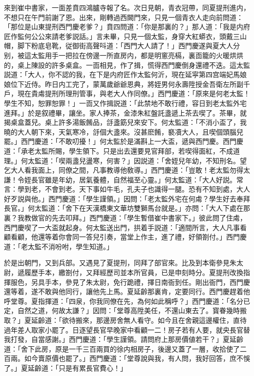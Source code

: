 來到崔中書家，一面差賁四鴻臚寺報了名。次日見朝，青衣冠帶，同夏提刑進内，不想只在午門前謝了恩。出來，剛轉過西闕門來，只見一個青衣人走向前問道：「那位是山東提刑西門慶老爹？」賁四問道：「你是那裏的？」那人道：「我是内府匠作監何公公來請老爹説話。」言未畢，只見一個太監，身穿大紅蟒衣，頭戴三山帽，脚下粉底皂靴，従御街高聲呌道：「西門大人請了！」西門慶遂與夏大人分别，被這太監用手一把拉在傍邊一所直房内，都是明窻亮槅，裏靣籠的火暖烘烘的，桌上陳設的許多桌盒。一靣相見，作了揖，慌得西門慶倒身還禮不迭。這太監説道：「大人，你不認的我，在下是内府匠作太監何沂，現在延寜第四宫端妃馬娘娘位下近侍。昨日内工完了，蒙萬歲爺爺恩典，將姪男何永壽陞授金吾衛左所副千戶，現在貴䖏提刑所理刑管事，與老大人作同僚。」西門慶道：「原來是何老太監！學生不知，恕罪恕罪！」一靣又作揖説道：「此禁地不敢行禮，容日到老太監外宅進拜。」於是叙禮畢，讓坐。家人捧茶，金漆朱紅盤託盞遞上茶去喫了。茶畢，就揭桌盒蓋兒。桌上許多湯飯餚品，㧱盞筯兒來安下。何太監道：「不消小盃了，我曉的大人朝下來，天氣寒冷，㧱個大盞來。沒甚麽餚，褻凟大人，且喫個頭腦兒罷。」西門慶道：「不敢叨擾！」何太監於是滿斟上一大盃，遞與西門慶。西門慶道：「承老太監所賜，學生領下。只是出去還要見官拜部，若喫得面紅，不成道理。」何太監道：「喫兩盞兒盪寒，何害？」因説道：「舍姪兒年幼，不知刑名。望乞大人看我面上，同僚之間，凡事教導他敎導。」西門慶道：「豈敢！老太監勿得太謙！令姪長官雖是年幼，居氣養體，自然福至心靈。」何太監道：「大人好説。常言：學到老，不會到老。天下事如牛毛，孔夫子也識得一腿。恐有不知到處，大人好歹説與他。」西門慶道：「學生謹領。」因問：「老太監外宅在何䖏？學生好去奉拜長官。」何太監道：「舍下在天漢橋東文華坊雙獅馬台就是。」亦問：「大人下處在那裏？我教做官的先去叩拜。」西門慶道：「學生暫借崔中書家下。」彼此問了住䖏，西門慶喫了一大盃就起身。何太監送出門，拱着手説道：「適間所言，大人凡事看顧看顧，他還等着你會同一答兒引奏，當堂上作主，進了禮，好領劄付。」西門慶道：「老太監不消吩咐，學生知道。」

於是出朝門，又到兵部。又遇見了夏提刑，同拜了部官來。比及到本衛參見朱太尉，遞履歷手本，繳劄付，又拜經歷司並本所官員，已是申刻時分。夏提刑改換指揮服色，另具手本，參見了朱太尉，免行跪禮，擇日南衙到任。剛出衙門，西門慶還等着，遂不敢與他同行，讓他先上馬。夏延齡那裏肯，定要同行。西門慶趕着他呼堂尊。夏指揮道：「四泉，你我同僚在先，為何如此稱呼？」西門慶道：「名分已定，自然之道，何故太謙？」因問：「堂尊高陞美任，不還山東去了。寳眷幾時搬取？」夏延齡道：「欲待搬來，那邊房舍無人看守。如今且在舍親這邊權住，直待過年差人取家小罷了。日逐望長官早晚家中看顧一二！房子若有人要，就央長官替我打發，自當感謝。」西門慶道：「學生謹領。請問府上那房價値若干？」夏延齡道：「舍下此房，原是一千三百兩買的徐内相房子，後邊又蓋了一層，收拾使了二百兩。如今賣原價也罷了。」西門慶道：「堂尊說與我，有人問，我好回答，庶不悞了。」夏延齡道：「只是有累長官費心！」

